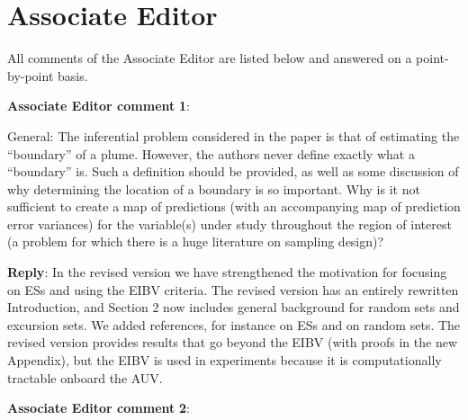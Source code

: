 \documentclass[a4paper]{article}
\newcounter{reviewer}
\def\aecom{\textbf{Associate Editor comment }}
\def\reply{\textbf{Reply}}
\begin{document}


 \section*{Associate Editor}
All comments of the Associate Editor are listed below and answered on a point-by-point basis.

\setcounter{reviewer}{1}





\vspace{5mm}
\noindent \aecom \textbf{1}:

General: The inferential problem considered in the paper is that of estimating the “boundary” of a plume. However, the authors never define exactly what a “boundary” is. Such a definition should be provided, as well as some discussion of why determining the location of a boundary is so important. Why is it not sufficient to create a map of predictions (with an accompanying map of prediction error variances) for the variable(s) under study throughout the region of interest (a problem for which there is a huge literature on sampling design)?\par

\reply: In the revised version we have strengthened the motivation for focusing on ESs and using the EIBV criteria. The revised version has an entirely rewritten Introduction, and Section 2 now includes general background for random sets and excursion sets. We added references, for instance \cite{adler2009random} on ESs and \cite{Molchanov2005} on random sets. The revised version provides results that go beyond the EIBV (with proofs in the new Appendix), but the EIBV is used in experiments because it is computationally tractable onboard the AUV.

\vspace{1em}

\vspace{5mm}
\noindent \aecom \textbf{2}:
\end{document}
